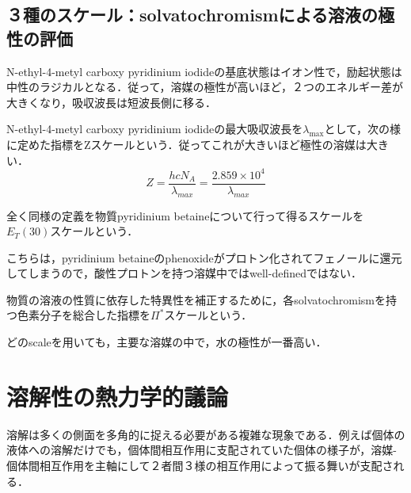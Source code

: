 \documentclass[uplatex, dvipdfmx]{jsreport}
\begin{document}
\subsection{３種のスケール：solvatochromismによる溶液の極性の評価}
\begin{example}
    N-ethyl-4-metyl carboxy pyridinium iodideの基底状態はイオン性で，励起状態は中性のラジカルとなる．従って，溶媒の極性が高いほど，２つのエネルギー差が大きくなり，吸収波長は短波長側に移る．
\end{example}
\begin{definition}[Z-scale]
    N-ethyl-4-metyl carboxy pyridinium iodideの最大吸収波長を$\lambda_{\max}$として，次の様に定めた指標をZスケールという．従ってこれが大きいほど極性の溶媒は大きい．
    \[ Z=\frac{hcN_A}{\lambda_{max}}=\frac{2.859\times 10^4}{\lambda_{max}} \]
\end{definition}
\begin{definition}[$E_T(30)$-scale]
    全く同様の定義を物質pyridinium betaineについて行って得るスケールを$E_T(30)$スケールという．

    こちらは，pyridinium betaineのphenoxideがプロトン化されてフェノールに還元してしまうので，酸性プロトンを持つ溶媒中ではwell-definedではない．
\end{definition}
\begin{definition}[$\Pi^*$-scale]
    物質の溶液の性質に依存した特異性を補正するために，各solvatochromismを持つ色素分子を総合した指標を$\Pi^*$スケールという．
\end{definition}
\begin{example}
    どのscaleを用いても，主要な溶媒の中で，水の極性が一番高い．
\end{example}

\section{溶解性の熱力学的議論}
溶解は多くの側面を多角的に捉える必要がある複雑な現象である．例えば個体の液体への溶解だけでも，個体間相互作用に支配されていた個体の様子が，溶媒-個体間相互作用を主軸にして２者間３様の相互作用によって振る舞いが支配される．
\end{document}
